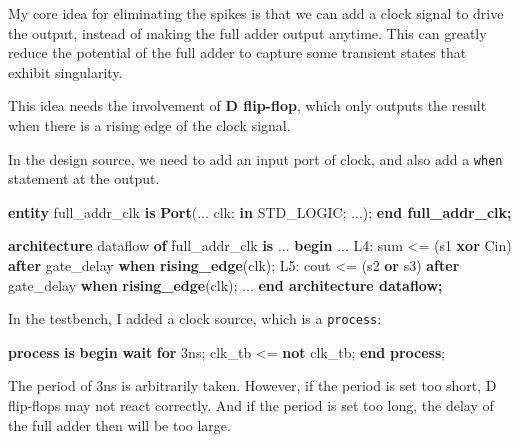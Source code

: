 \documentclass[
]{article}
\newenvironment{Shaded}{}{}
\newcommand{\ControlFlowTok}[1]{\textcolor[rgb]{0.00,0.44,0.13}{\textbf{#1}}}
\newcommand{\DataTypeTok}[1]{\textcolor[rgb]{0.56,0.13,0.00}{#1}}
\newcommand{\DecValTok}[1]{\textcolor[rgb]{0.25,0.63,0.44}{#1}}
\newcommand{\FunctionTok}[1]{\textcolor[rgb]{0.02,0.16,0.49}{#1}}
\newcommand{\KeywordTok}[1]{\textcolor[rgb]{0.00,0.44,0.13}{\textbf{#1}}}
\newcommand{\NormalTok}[1]{#1}
\newcommand{\OtherTok}[1]{\textcolor[rgb]{0.00,0.44,0.13}{#1}}
\begin{document}
My core idea for eliminating the spikes is that we can add a clock
signal to drive the output, instead of making the full adder output
anytime. This can greatly reduce the potential of the full adder to
capture some transient states that exhibit singularity.

This idea needs the involvement of \textbf{D flip-flop}, which only
outputs the result when there is a rising edge of the clock signal.

In the design source, we need to add an input port of clock, and also
add a \texttt{when} statement at the output.

\begin{Shaded}
\begin{Highlighting}[]
\ControlFlowTok{entity} \DecValTok{full\_addr\_clk} \KeywordTok{is}
\ControlFlowTok{Port}\NormalTok{(}\OtherTok{...}
\NormalTok{	clk}\OtherTok{:} \KeywordTok{in} \DataTypeTok{STD\_LOGIC}\NormalTok{;}
	\OtherTok{...}\NormalTok{);}
\ControlFlowTok{end full\_addr\_clk;}
    
\ControlFlowTok{architecture} \DecValTok{dataflow} \KeywordTok{of} \FunctionTok{full\_addr\_clk} \KeywordTok{is}
    \OtherTok{...}
\KeywordTok{begin}
    \OtherTok{...}
\NormalTok{    L4}\OtherTok{:}\NormalTok{ sum }\OtherTok{\textless{}=}\NormalTok{ (s1 }\KeywordTok{xor}\NormalTok{ Cin) }\KeywordTok{after}\NormalTok{ gate\_delay }\KeywordTok{when} \KeywordTok{rising\_edge}\NormalTok{(clk);}
\NormalTok{    L5}\OtherTok{:}\NormalTok{ cout }\OtherTok{\textless{}=}\NormalTok{ (s2 }\KeywordTok{or}\NormalTok{ s3) }\KeywordTok{after}\NormalTok{ gate\_delay }\KeywordTok{when} \KeywordTok{rising\_edge}\NormalTok{(clk);}
    \OtherTok{...}
\ControlFlowTok{end architecture dataflow;}
\end{Highlighting}
\end{Shaded}

In the testbench, I added a clock source, which is a \texttt{process}:

\begin{Shaded}
\begin{Highlighting}[]
    \KeywordTok{process} \KeywordTok{is}
    \KeywordTok{begin}
        \KeywordTok{wait} \KeywordTok{for}\NormalTok{ 3ns;}
\NormalTok{        clk\_tb }\OtherTok{\textless{}=} \KeywordTok{not}\NormalTok{ clk\_tb;}
    \KeywordTok{end} \KeywordTok{process}\NormalTok{;}
\end{Highlighting}
\end{Shaded}

The period of 3ns is arbitrarily taken. However, if the period is set
too short, D flip-flops may not react correctly. And if the period is
set too long, the delay of the full adder then will be too large.
\end{document}
